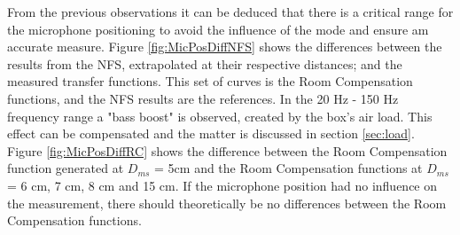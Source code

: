 \documentclass{report}
\begin{document}
From the previous observations it can be deduced that there is a critical range for the microphone positioning to avoid the influence of the mode and ensure am accurate measure. Figure \ref{fig:MicPosDiffNFS} shows the differences between the results from the NFS, extrapolated at their respective distances; and the measured transfer functions. This set of curves is the Room Compensation functions, and the NFS results are the references. In the 20 Hz - 150 Hz frequency range a "bass boost" is observed, created by the box's air load. This effect can be compensated and the matter is discussed in section \ref{sec:load}.\\

Figure \ref{fig:MicPosDiffRC} shows the difference between the Room Compensation function generated at $D_{ms}$ = 5cm and the Room Compensation functions at $D_{ms}$ = 6 cm, 7 cm, 8 cm and 15 cm. If the microphone position had no influence on the measurement, there should theoretically be no differences between the Room Compensation functions. \\
\end{document}
